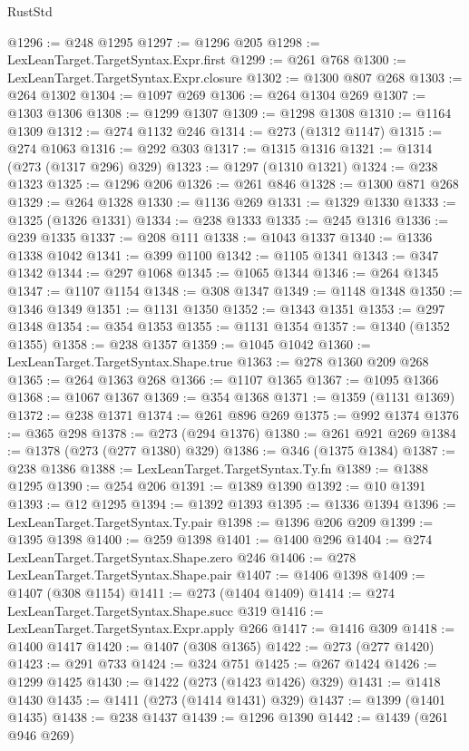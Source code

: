 \begin{lexlean}{RustStd}
\begin{coremodule}
{{{{{{{{{{{{{{{{{{{@1296 := @248 @1295
@1297 := @1296 @205
@1298 := LexLeanTarget.TargetSyntax.Expr.first
@1299 := @261 @768
@1300 := LexLeanTarget.TargetSyntax.Expr.closure
@1302 := @1300 @807 @268
@1303 := @264 @1302
@1304 := @1097 @269
@1306 := @264 @1304 @269
@1307 := @1303 @1306
@1308 := @1299 @1307
@1309 := @1298 @1308
@1310 := @1164 @1309
@1312 := @274 @1132 @246
@1314 := @273 (@1312 @1147)
@1315 := @274 @1063
@1316 := @292 @303
@1317 := @1315 @1316
@1321 := @1314 (@273 (@1317 @296) @329)
@1323 := @1297 (@1310 @1321)
@1324 := @238 @1323
@1325 := @1296 @206
@1326 := @261 @846
@1328 := @1300 @871 @268
@1329 := @264 @1328
@1330 := @1136 @269
@1331 := @1329 @1330
@1333 := @1325 (@1326 @1331)
@1334 := @238 @1333
@1335 := @245 @1316
@1336 := @239 @1335
@1337 := @208 @111
@1338 := @1043 @1337
@1340 := @1336 @1338 @1042
@1341 := @399 @1100
@1342 := @1105 @1341
@1343 := @347 @1342
@1344 := @297 @1068
@1345 := @1065 @1344
@1346 := @264 @1345
@1347 := @1107 @1154
@1348 := @308 @1347
@1349 := @1148 @1348
@1350 := @1346 @1349
@1351 := @1131 @1350
@1352 := @1343 @1351
@1353 := @297 @1348
@1354 := @354 @1353
@1355 := @1131 @1354
@1357 := @1340 (@1352 @1355)
@1358 := @238 @1357
@1359 := @1045 @1042
@1360 := LexLeanTarget.TargetSyntax.Shape.true
@1363 := @278 @1360 @209 @268
@1365 := @264 @1363 @268
@1366 := @1107 @1365
@1367 := @1095 @1366
@1368 := @1067 @1367
@1369 := @354 @1368
@1371 := @1359 (@1131 @1369)
@1372 := @238 @1371
@1374 := @261 @896 @269
@1375 := @992 @1374
@1376 := @365 @298
@1378 := @273 (@294 @1376)
@1380 := @261 @921 @269
@1384 := @1378 (@273 (@277 @1380) @329)
@1386 := @346 (@1375 @1384)
@1387 := @238 @1386
@1388 := LexLeanTarget.TargetSyntax.Ty.fn
@1389 := @1388 @1295
@1390 := @254 @206
@1391 := @1389 @1390
@1392 := @10 @1391
@1393 := @12 @1295
@1394 := @1392 @1393
@1395 := @1336 @1394
@1396 := LexLeanTarget.TargetSyntax.Ty.pair
@1398 := @1396 @206 @209
@1399 := @1395 @1398
@1400 := @259 @1398
@1401 := @1400 @296
@1404 := @274 LexLeanTarget.TargetSyntax.Shape.zero @246
@1406 := @278 LexLeanTarget.TargetSyntax.Shape.pair
@1407 := @1406 @1398
@1409 := @1407 (@308 @1154)
@1411 := @273 (@1404 @1409)
@1414 := @274 LexLeanTarget.TargetSyntax.Shape.succ @319
@1416 := LexLeanTarget.TargetSyntax.Expr.apply @266
@1417 := @1416 @309
@1418 := @1400 @1417
@1420 := @1407 (@308 @1365)
@1422 := @273 (@277 @1420)
@1423 := @291 @733
@1424 := @324 @751
@1425 := @267 @1424
@1426 := @1299 @1425
@1430 := @1422 (@273 (@1423 @1426) @329)
@1431 := @1418 @1430
@1435 := @1411 (@273 (@1414 @1431) @329)
@1437 := @1399 (@1401 @1435)
@1438 := @238 @1437
@1439 := @1296 @1390
@1442 := @1439 (@261 @946 @269)
}}}}}}}}}}}}}}}}}}}
\end{coremodule}
\end{lexlean}
